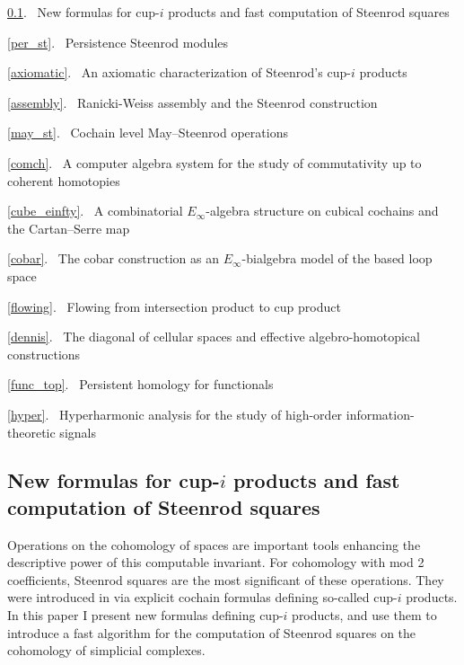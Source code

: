 \documentclass{amsart}
\begin{document}
\cref{fast_sq}. \ New formulas for cup-$i$ products and fast computation of Steenrod squares \cite{medina2023fast_sq} \par
\cref{per_st}. \ Persistence Steenrod modules \cite{medina2022per_st} \par
\cref{axiomatic}. \ An axiomatic characterization of Steenrod's cup-$i$ products \cite{medina2022axiomatic} \par
\cref{assembly}. \ Ranicki-Weiss assembly and the Steenrod construction \cite{medina2022assembly} \par
\cref{may_st}. \ Cochain level May--Steenrod operations \cite{medina2021may_st} \par
\cref{comch}. \ A computer algebra system for the study of commutativity up to coherent homotopies \cite{medina2021comch} \par
\cref{cube_einfty}. \ A combinatorial $E_\infty $-algebra structure on cubical cochains and the Cartan--Serre map \cite{medina2022cube_einfty} \par
\cref{cobar}. \ The cobar construction as an $E_\infty$-bialgebra model of the based loop space \cite{medina2021cobar} \par
\cref{flowing}. \ Flowing from intersection product to cup product \cite{medina2021flowing} \par
\cref{dennis}. \ The diagonal of cellular spaces and effective algebro-homotopical constructions \cite{medina2022dennis} \par
\cref{func_top}. \ Persistent homology for functionals \cite{medina2022fuct_top} \par
\cref{hyper}. \ Hyperharmonic analysis for the study of high-order information-theoretic signals \cite{medina2021flowing} \par

\newpage

\subsection{New formulas for cup-$i$ products and fast computation of Steenrod squares {\rm \cite{medina2023fast_sq}}} \label{fast_sq}

Operations on the cohomology of spaces are important tools enhancing the descriptive power of this computable invariant.
For cohomology with mod 2 coefficients, Steenrod squares are the most significant of these operations.
They were introduced in \cite{steenrod1947products} via explicit cochain formulas defining so-called cup-$i$ products.
In this paper I present new formulas defining cup-$i$ products, and use them to introduce a fast algorithm for the computation of Steenrod squares on the cohomology of simplicial complexes.
\end{document}
